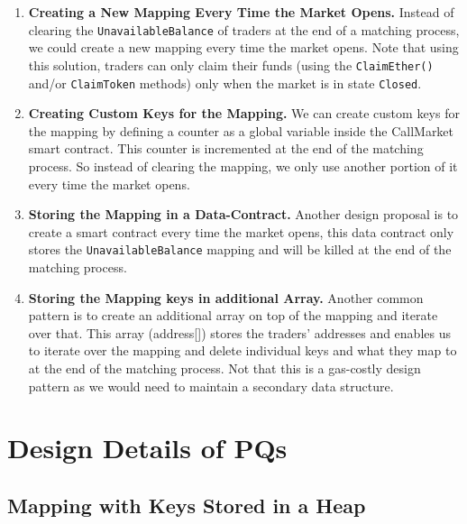 \begin{enumerate}

\item \textbf{Creating a New Mapping Every Time the Market Opens.} Instead of clearing the \texttt{UnavailableBalance} of traders at the end of a matching process, we could create a new mapping every time the market opens. Note that using this solution, traders can only claim their funds (using the \texttt{ClaimEther()} and/or \texttt{ClaimToken} methods) only when the market is in state \texttt{Closed}. 

\item \textbf{Creating Custom Keys for the Mapping.} We can create custom keys for the mapping by defining a counter as a global variable inside the CallMarket smart contract. This counter is incremented at the end of the matching process. So instead of clearing the mapping, we only use another portion of it every time the market opens.

\item \textbf{Storing the Mapping in a Data-Contract.} Another design proposal is to create a smart contract every time the market opens, this data contract only stores the \texttt{UnavailableBalance} mapping and will be killed at the end of the matching process.

\item \textbf{Storing the Mapping keys in additional Array.} Another common pattern is to create an additional array on top of the mapping and iterate over that. This array (\eg address[]) stores the traders' addresses and enables us to iterate over the mapping and delete individual keys and what they map to at the end of the matching process. Not that this is a gas-costly design pattern as we would need to maintain a secondary data structure.

\end{enumerate}


\section{Design Details of PQs}



\subsection{Mapping with Keys Stored in a Heap}\label{sec:mapping_heap}

